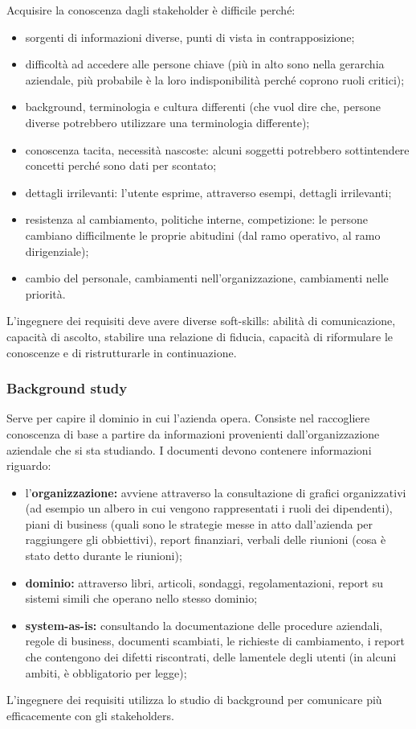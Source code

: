 Acquisire la conoscenza dagli stakeholder è difficile perché:
\begin{itemize}
	\item sorgenti di informazioni diverse, punti di vista in contrapposizione;
	\item difficoltà ad accedere alle persone chiave (più in alto sono nella gerarchia aziendale, più probabile è la loro indisponibilità perché coprono ruoli critici);
	\item background, terminologia e cultura differenti (che vuol dire che, persone diverse potrebbero utilizzare una terminologia differente);
	\item conoscenza tacita, necessità nascoste: alcuni soggetti potrebbero sottintendere concetti perché sono dati per scontato;
	\item dettagli irrilevanti: l'utente esprime, attraverso esempi, dettagli irrilevanti;
	\item resistenza al cambiamento, politiche interne, competizione: le persone cambiano difficilmente le proprie abitudini (dal ramo operativo, al ramo dirigenziale);
	\item cambio del personale, cambiamenti nell'organizzazione, cambiamenti nelle priorità.
\end{itemize}
L'ingegnere dei requisiti deve avere diverse soft-skills: abilità di comunicazione, capacità di ascolto, stabilire una relazione di fiducia, capacità di riformulare le conoscenze e di ristrutturarle in continuazione.

\subsubsection{Background study} Serve per capire il dominio in cui l'azienda opera. Consiste nel raccogliere conoscenza di base a partire da informazioni provenienti dall'organizzazione aziendale che si sta studiando. I documenti devono contenere informazioni riguardo:
\begin{itemize}
	\item l'\textbf{organizzazione:} avviene attraverso la consultazione di grafici organizzativi (ad esempio un albero in cui vengono rappresentati i ruoli dei dipendenti), piani di business (quali sono le strategie messe in atto dall'azienda per raggiungere gli obbiettivi), report finanziari, verbali delle riunioni (cosa è stato detto durante le riunioni);
	\item \textbf{dominio:} attraverso libri, articoli, sondaggi, regolamentazioni, report su sistemi simili che operano nello stesso dominio;
	\item \textbf{system-as-is:} consultando la documentazione delle procedure aziendali, regole di business, documenti scambiati, le richieste di cambiamento, i report che contengono dei difetti riscontrati, delle lamentele degli utenti (in alcuni ambiti, è obbligatorio per legge);
\end{itemize}
L'ingegnere dei requisiti utilizza lo studio di background per comunicare più efficacemente con gli stakeholders.

